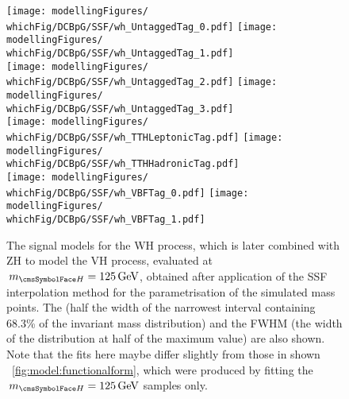 \begin{figure}[htp!]
\centering
\texttt{[image: modellingFigures/\\whichFig/DCBpG/SSF/wh\_UntaggedTag\_0.pdf]} 
\texttt{[image: modellingFigures/\\whichFig/DCBpG/SSF/wh\_UntaggedTag\_1.pdf]} \\
\texttt{[image: modellingFigures/\\whichFig/DCBpG/SSF/wh\_UntaggedTag\_2.pdf]} 
\texttt{[image: modellingFigures/\\whichFig/DCBpG/SSF/wh\_UntaggedTag\_3.pdf]} \\ 
\texttt{[image: modellingFigures/\\whichFig/DCBpG/SSF/wh\_TTHLeptonicTag.pdf]} 
\texttt{[image: modellingFigures/\\whichFig/DCBpG/SSF/wh\_TTHHadronicTag.pdf]} \\ 
\texttt{[image: modellingFigures/\\whichFig/DCBpG/SSF/wh\_VBFTag\_0.pdf]} 
\texttt{[image: modellingFigures/\\whichFig/DCBpG/SSF/wh\_VBFTag\_1.pdf]} \\

\caption{The signal models for the WH process, which is later combined with ZH to model the VH process, evaluated at $\mH=125\GeV$, obtained after application of the SSF interpolation method for the \DCBpG parametrisation of the simulated mass points. The \effSigma (half the width of the narrowest interval containing 68.3\% of the invariant mass distribution) and the FWHM (the width of the distribution at half of the maximum value) are also shown. Note that the fits here maybe differ slightly from those in shown \Fig~\ref{fig:model:functionalform}, which were produced by fitting the $\mH=125\GeV$ samples only.}

\label{fig:model:sig_model_per_wh}
\end{figure}

